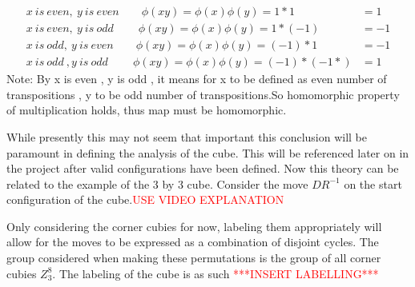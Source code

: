 \documentclass{article}
\begin{document}
\begin{align}
x\ is\ even,\ y\ is\ even\qquad	\phi(xy) = \phi(x)\phi(y) = 1*1 &= 1\\
x\ is\ even,\ y\ is\ odd\ \qquad	\phi(xy) = \phi(x)\phi(y) = 1*(-1) &= -1\\
x\ is\ odd,\ y\ is\ even\qquad	\phi(xy) = \phi(x)\phi(y) = (-1)*1 &= -1\\
x\ is\ odd\ ,y\ is\ odd \ \qquad	\phi(xy) = \phi(x)\phi(y) = (-1)*(-1*) &= 1
\end{align}
Note: By x is even , y is odd , it means for x to be defined as even number of transpositions , y to be odd number of transpositions.So homomorphic property of multiplication holds, thus map must be homomorphic.



While presently this may not seem that important this conclusion will be paramount in defining the analysis of the cube. This will be referenced later on in the project after valid configurations have been defined.
Now this theory can be related to the example of the 3 by 3 cube. Consider the move $DR^{-1}$ on the start configuration of the cube.\textcolor{red}{USE VIDEO EXPLANATION}


\begin{figure}[hbt]
\centering%
  \RubikCubeSolved%
    \hspace{.4cm}
    \quad{}%
    \hspace{.4cm}
  	\hspace{.4cm}
    \quad{}%
    \hspace{.4cm}
\end{figure}
Only considering the corner cubies for now, labeling them appropriately will allow for the moves to be expressed as a combination of disjoint cycles. The group considered when making these permutations is the group of all corner cubies $Z_{3}^{8}$. The labeling of the cube is as such \textcolor{red}{***INSERT LABELLING***}
\end{document}
